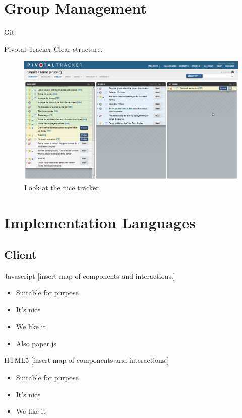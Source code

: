 \documentclass{beamer}
\begin{document}
\section{Group Management}

\begin{frame}{Git}
\end{frame}

\begin{frame}{Pivotal Tracker}
  Clear structure.
  \begin{figure}[htb]
    \centering
    \includegraphics[scale=0.25]{pivotal.png}
    \caption{Look at the nice tracker}
  \end{figure}
\end{frame}


\section{Implementation Languages}
\subsection{Client}

\begin{frame}{Javascript}
  [insert map of components and interactions.]
  \begin{itemize}
    \item Suitable for purpose
    \item It's nice
    \item We like it
    \item Also paper.js
  \end{itemize}
\end{frame}

\begin{frame}{HTML5}
  [insert map of components and interactions.]
  \begin{itemize}
    \item Suitable for purpose
    \item It's nice
    \item We like it
  \end{itemize}
\end{frame}
\end{document}
